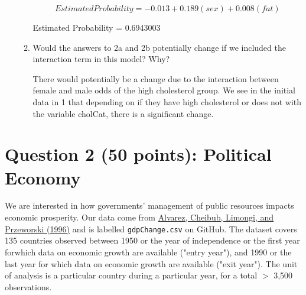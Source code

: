 \documentclass[12pt,letterpaper]{article}
\begin{document}
\begin{enumerate}
\begin{enumerate}
		\vspace{.5cm}
		  
		\vspace{.5cm}
		
\begin{equation}
Estimated Probability = -0.013 + 0.189(sex) + 0.008(fat)
\end{equation}	

Estimated Probability = 0.6943003	
		\item
		Would the answers to 2a and 2b potentially change if we included the interaction term in this model? Why? 
		
	There would potentially be a change due to the interaction between female and male odds of the high cholesterol group. We see in the initial data in 1 that depending on if they have high cholesterol or does not with the variable cholCat, there is a significant change. 

	
		
	\end{enumerate}
\end{enumerate}
\newpage


\section*{Question 2 (50 points): Political Economy}
\vspace{.25cm}
\noindent We are interested in how governments' management of public resources impacts economic prosperity. Our data come from \href{https://www.researchgate.net/profile/Adam_Przeworski/publication/240357392_Classifying_Political_Regimes/links/0deec532194849aefa000000/Classifying-Political-Regimes.pdf}{Alvarez, Cheibub, Limongi, and Przeworski (1996)} and is labelled \texttt{gdpChange.csv} on GitHub. The dataset covers 135 countries observed between 1950 or the year of independence or the first year forwhich data on economic growth are available ("entry year"), and 1990 or the last year for which data on economic growth are available ("exit year"). The unit of analysis is a particular country during a particular year, for a total $>$ 3,500 observations. 
\end{document}
